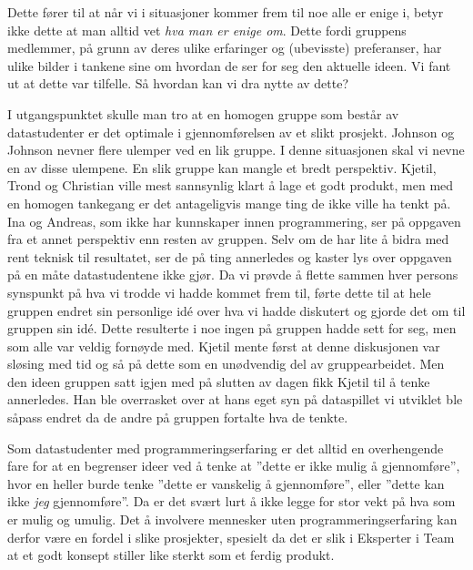 	Dette fører til at når vi i situasjoner kommer frem til noe alle er enige i, betyr ikke dette at man alltid vet \emph{hva man er enige om}. Dette fordi gruppens medlemmer, på grunn av deres ulike erfaringer og (ubevisste) preferanser, har ulike bilder i tankene sine om hvordan de ser for seg den aktuelle ideen. Vi fant ut at dette var tilfelle. Så hvordan kan vi dra nytte av dette?

	I utgangspunktet skulle man tro at en homogen gruppe som består av datastudenter er det optimale i gjennomførelsen av et slikt prosjekt. Johnson og Johnson nevner flere ulemper ved en lik gruppe. I denne situasjonen skal vi nevne en av disse ulempene. En slik gruppe kan mangle et bredt perspektiv. Kjetil, Trond og Christian ville mest sannsynlig klart å lage et godt produkt, men med en homogen tankegang er det antageligvis mange ting de ikke ville ha tenkt på. Ina og Andreas, som ikke har kunnskaper innen programmering, ser på oppgaven fra et annet perspektiv enn resten av gruppen. Selv om de har lite å bidra med rent teknisk til resultatet, ser de på ting annerledes og kaster lys over oppgaven på en måte datastudentene ikke gjør. Da vi prøvde å flette sammen hver persons synspunkt på hva vi trodde vi hadde kommet frem til, førte dette til at hele gruppen endret sin personlige idé over hva vi hadde diskutert og gjorde det om til gruppen sin idé. Dette resulterte i noe ingen på gruppen hadde sett for seg, men som alle var veldig fornøyde med.  Kjetil mente først at denne diskusjonen var sløsing med tid og så på dette som en unødvendig del av gruppearbeidet. Men den ideen gruppen satt igjen med på slutten av dagen fikk Kjetil til å tenke annerledes. Han ble overrasket over at hans eget syn på dataspillet vi utviklet ble såpass endret da de andre på gruppen fortalte hva de tenkte. 


Som datastudenter med programmeringserfaring er det alltid en overhengende fare for at en begrenser ideer ved å tenke at ''dette er ikke mulig å gjennomføre'', hvor en heller burde tenke ''dette er vanskelig å gjennomføre'', eller ''dette kan ikke  \emph{jeg} gjennomføre''. Da er det svært lurt å ikke legge for stor vekt på hva som er mulig og umulig. Det å involvere mennesker uten programmeringserfaring kan derfor være en fordel i slike prosjekter, spesielt da det er slik i Eksperter i Team at et godt konsept stiller like sterkt som et ferdig produkt. 


